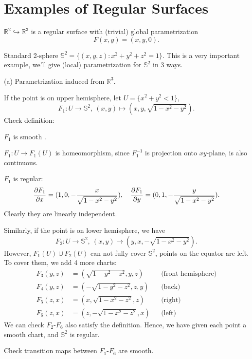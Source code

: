 \section{Examples of Regular Surfaces}

\begin{example}
    \(\mathbb{R}^2\hookrightarrow\mathbb{R}^3\) is a regular surface with (trivial)
    global parametrization \[
        F(x,y)=(x,y,0)
    .\] 
\end{example}

\begin{example}
    \label{charts on unit sphere}
    Standard 2-sphere \(\mathbb{S}^2=\{(x,y,z):x^2+y^2+z^2=1\}\). This is a very
    important example, we'll give (local) parametrization for \(\mathbb{S}^2\)
    in 3 ways.
\end{example}
\noindent (a) Parametrization induced from \(\mathbb{R}^3\).

If the point is on upper hemisphere, let \(U=\{x^2+y^2<1\}\), \[
    F_1\colon U\to \mathbb{S}^2,\ (x,y)\mapsto (x,y,\sqrt{1-x^2-y^2}).
\] Check definition:

\(F_1\) is smooth \checkmark{}. 

\(F_1\colon U\to F_1(U)\) is homeomorphism, since \(F_1^{-1}\) is
projection onto \(xy\)-plane, is also continuous.

\(F_1\) is regular: \[
    \pdv{F_1}{x}=(1,0,-\frac{x}{\sqrt{1-x^2-y^2}}),\quad
    \pdv{F_1}{y}=(0,1,-\frac{y}{\sqrt{1-x^2-y^2}})
.\] Clearly they are linearly independent.

Similarly, if the point is on lower hemisphere, we have \[
    F_2\colon U\to \mathbb{S}^2,\ (x,y)\mapsto (y,x,-\sqrt{1-x^2-y^2})
.\] However, \(F_1(U)\cup F_2(U)\) can not fully cover \(\mathbb{S}^2\), points on
the equator are left. To cover them, we add 4 more charts:
\begin{align*}
    F_3(y,z)&= (\sqrt{1-y^2-z^2},y,z) &&\text{(front hemisphere)} \\
    F_4(y,z)&= (-\sqrt{1-y^2-z^2},z,y) &&\text{(back)} \\
    F_5(z,x)&= (x,\sqrt{1-x^2-z^2},z) &&\text{(right)} \\
    F_6(z,x)&= (z,-\sqrt{1-x^2-z^2},x) &&\text{(left)}
\end{align*}
We can check \(F_2\)-\(F_6\) also satisfy the definition. Hence, we have given each
point a smooth chart, and \(\mathbb{S}^2\) is regular.
\begin{exercise}
    Check transition maps between \(F_1\)-\(F_6\) are smooth.
\end{exercise}

